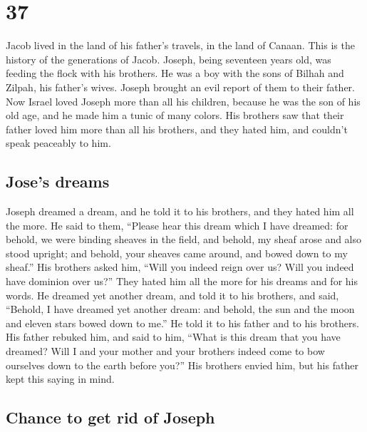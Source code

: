 \hypertarget{section-36}{%
\section{37}\label{section-36}}

 Jacob lived in the land of his father's travels, in the
land of Canaan.  This is the history of the generations of
Jacob. Joseph, being seventeen years old, was feeding the flock with his
brothers. He was a boy with the sons of Bilhah and Zilpah, his father's
wives. Joseph brought an evil report of them to their father.
 Now Israel loved Joseph more than all his children,
because he was the son of his old age, and he made him a tunic of many
colors.  His brothers saw that their father loved him more
than all his brothers, and they hated him, and couldn't speak peaceably
to him.

\hypertarget{joses-dreams}{%
\subsection{Jose's dreams}\label{joses-dreams}}

 Joseph dreamed a dream, and he told it to his brothers,
and they hated him all the more.  He said to them,
``Please hear this dream which I have dreamed:  for
behold, we were binding sheaves in the field, and behold, my sheaf arose
and also stood upright; and behold, your sheaves came around, and bowed
down to my sheaf.''  His brothers asked him, ``Will you
indeed reign over us? Will you indeed have dominion over us?'' They
hated him all the more for his dreams and for his words. 
He dreamed yet another dream, and told it to his brothers, and said,
``Behold, I have dreamed yet another dream: and behold, the sun and the
moon and eleven stars bowed down to me.''  He told it to
his father and to his brothers. His father rebuked him, and said to him,
``What is this dream that you have dreamed? Will I and your mother and
your brothers indeed come to bow ourselves down to the earth before
you?''  His brothers envied him, but his father kept this
saying in mind.

\hypertarget{chance-to-get-rid-of-joseph}{%
\subsection{Chance to get rid of
Joseph}\label{chance-to-get-rid-of-joseph}}

